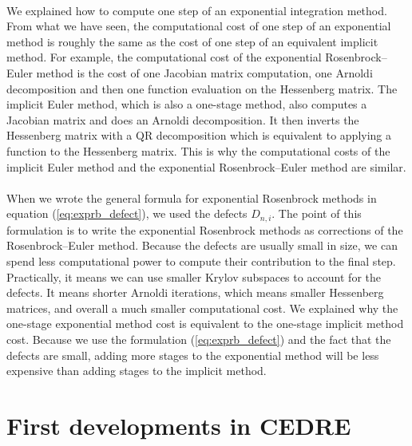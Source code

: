   \paragraph{}
  We explained how to compute one step of an exponential integration method.
  From what we have seen, the computational cost of one step of an exponential method is roughly the same as the cost of one step of an equivalent implicit method.
  For example, the computational cost of the exponential Rosenbrock--Euler method is the cost of one Jacobian matrix computation, one Arnoldi decomposition and then one function evaluation on the Hessenberg matrix.
  The implicit Euler method, which is also a one-stage method, also computes a Jacobian matrix and does an Arnoldi decomposition.
  It then inverts the Hessenberg matrix with a QR decomposition which is equivalent to applying a function to the Hessenberg matrix.
  This is why the computational costs of the implicit Euler method and the exponential Rosenbrock--Euler method are similar.

  \paragraph{}
  When we wrote the general formula for exponential Rosenbrock methods in equation (\ref{eq:exprb_defect}), we used the defects $D_{n,i}$.
  The point of this formulation is to write the exponential Rosenbrock methods as corrections of the Rosenbrock--Euler method.
  Because the defects are usually small in size, we can spend less computational power to compute their contribution to the final step.
  Practically, it means we can use smaller Krylov subspaces to account for the defects.
  It means shorter Arnoldi iterations, which means smaller Hessenberg matrices, and overall a much smaller computational cost.
  We explained why the one-stage exponential method cost is equivalent to the one-stage implicit method cost.
  Because we use the formulation (\ref{eq:exprb_defect}) and the fact that the defects are small, adding more stages to the exponential method will be less expensive than adding stages to the implicit method.


  \pagebreak
  \section{First developments in CEDRE}

